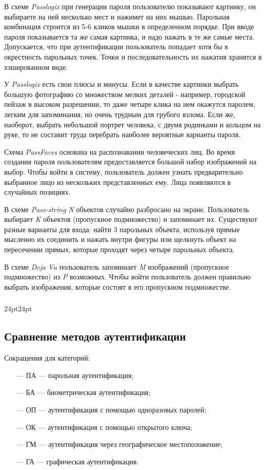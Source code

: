 В схеме \textit{Passlogix} \cite{bib9} при генерации пароля пользователю показывают картинку, он выбираете на ней несколько мест и нажимет на них мышью. Парольная комбинация строится из 5-6 кликов мышки в определенном порядке. При вводе пароля показывается та же самая картинка, и надо нажать в те же самые места. Допускается, что при аутентификации пользователь попадает хотя бы в окрестность парольных точек. Точки и последовательность их нажатия хранятся в хэшированном виде. 

У \textit{Passlogix} есть свои плюсы и минусы. Если в качестве картинки выбрать большую фотографию со множеством мелких деталей - например, городской пейзаж в высоком разрешении, то даже четыре клика на нем окажутся паролем, легким для запоминания, но очень трудным для грубого взлома. Если же, наоборот, выбрать небольшой портрет человека, с двумя родинками и кольцом на руке, то не составит труда перебрать наиболее вероятные варианты пароля.

Схема \textit{PassFaces} \cite{bib9} основана на распознавании человеческих лиц. Во время создания пароля пользователям предоставляется большой набор изображений на выбор. Чтобы войти в систему, пользователь должен узнать предварительно выбранное лицо из нескольких представленных ему. Лица появляются в случайных позициях.

В схеме \textit{Pass-string} \cite{bib9} \textit{N} объектов случайно разбросано на экране. Пользователь выбирает \textit{K} объектов (пропускное подмножество) и запоминает их. Существуют разные варианты для входа: найти 3 парольных объекта, используя прямые мысленно их соединить и нажать внутри фигуры или щелкнуть объект на пересечении прямых, которые проходят через четыре парольных объекта.

В схеме \textit{Deja Vu} \cite{bib9} пользователь запоминает \textit{M} изображений (пропускное подмножество) из \textit{P} возможных. Чтобы войти пользователь должен правильно выбрать изображения, которые состоят в его пропускном подмножестве.

\titlespacing\subsubsection{\parindent}{24pt}{24pt}
\subsection{Сравнение методов аутентификации}
Сокращения для категорий:
\begin{itemize}
    \item [---] ПА --- парольная аутентификация;
    \item [---] БА --- биометрическая аутентификация;
    \item [---] ОП --- аутентификация с помощью одноразовых паролей;
    \item [---] ОК --- аутентификация с помощью открытого ключа;
    \item [---] ГМ --- аутентификация через географическое местоположение;
    \item [---] ГА --- графическая аутентификация.
\end{itemize}

